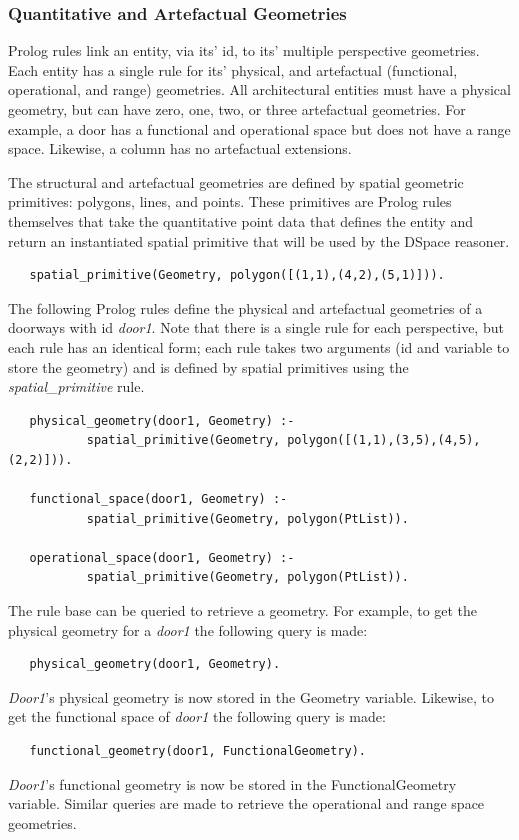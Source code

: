 \documentclass[12pt]{ucthesis}
\begin{document}
\subsubsection{Quantitative and Artefactual Geometries}
Prolog rules link an entity, via its' id, to its' multiple perspective geometries. Each entity has a single rule for its' physical, and artefactual (functional, operational, and range) geometries. All architectural entities must have a physical geometry, but can have zero, one, two, or three artefactual geometries. For example, a door has a functional and operational space but does not have a range space. Likewise, a column has no artefactual extensions. 

The structural and artefactual geometries are defined by spatial geometric primitives: polygons, lines, and points. These primitives are Prolog rules themselves that take the quantitative point data that defines the entity and return an instantiated spatial primitive that will be used by the DSpace reasoner. 
\begin{verbatim}
   spatial_primitive(Geometry, polygon([(1,1),(4,2),(5,1)])).
\end{verbatim}

The following Prolog rules define the physical and artefactual geometries of a doorways with id \emph{door1}. Note that there is a single rule for each perspective, but each rule has an identical form; each rule takes two arguments (id and variable to store the geometry) and is defined by spatial primitives using the \emph{spatial\_primitive} rule. 
\begin{verbatim}
   physical_geometry(door1, Geometry) :-
           spatial_primitive(Geometry, polygon([(1,1),(3,5),(4,5),(2,2)])).
           
   functional_space(door1, Geometry) :-
           spatial_primitive(Geometry, polygon(PtList)).
           
   operational_space(door1, Geometry) :-
           spatial_primitive(Geometry, polygon(PtList)).
\end{verbatim}

The rule base can be queried to retrieve a geometry. For example, to get the physical geometry for a \emph{door1} the following query is made:
\begin{verbatim}
   physical_geometry(door1, Geometry).
\end{verbatim} 
\emph{Door1}'s physical geometry is now stored in the Geometry variable. Likewise, to get the functional space of \emph{door1} the following query is made:
\begin{verbatim}
   functional_geometry(door1, FunctionalGeometry).
\end{verbatim}
\emph{Door1}'s functional geometry is now be stored in the FunctionalGeometry variable. Similar queries are made to retrieve the operational and range space geometries.
\end{document}
